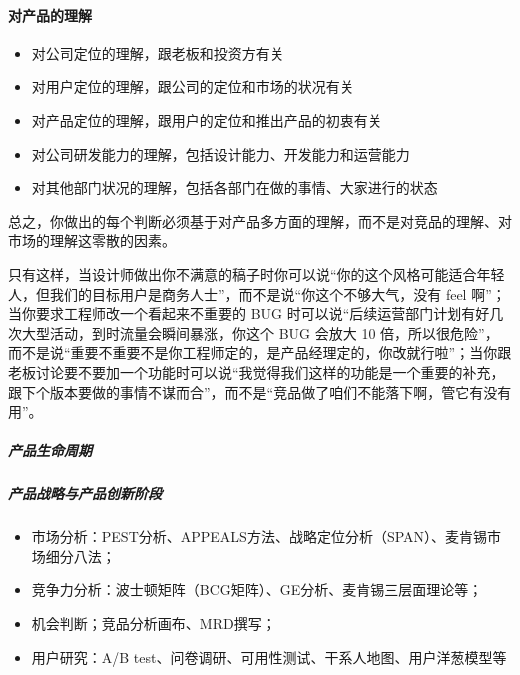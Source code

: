 \documentclass[letterpaper,10pt,english]{sphinxmanual}
\begin{document}
\paragraph{对产品的理解}
\label{\detokenize{chapter_introduction/ability:id9}}\begin{itemize}
\item {} 
对公司定位的理解，跟老板和投资方有关

\item {} 
对用户定位的理解，跟公司的定位和市场的状况有关

\item {} 
对产品定位的理解，跟用户的定位和推出产品的初衷有关

\item {} 
对公司研发能力的理解，包括设计能力、开发能力和运营能力

\item {} 
对其他部门状况的理解，包括各部门在做的事情、大家进行的状态

\end{itemize}

总之，你做出的每个判断必须基于对产品多方面的理解，而不是对竞品的理解、对市场的理解这零散的因素。

只有这样，当设计师做出你不满意的稿子时你可以说“你的这个风格可能适合年轻人，但我们的目标用户是商务人士”，而不是说“你这个不够大气，没有
feel 啊”；当你要求工程师改一个看起来不重要的 BUG
时可以说“后续运营部门计划有好几次大型活动，到时流量会瞬间暴涨，你这个
BUG 会放大 10
倍，所以很危险”，而不是说“重要不重要不是你工程师定的，是产品经理定的，你改就行啦”；当你跟老板讨论要不要加一个功能时可以说“我觉得我们这样的功能是一个重要的补充，跟下个版本要做的事情不谋而合”，而不是“竞品做了咱们不能落下啊，管它有没有用”。%
\begin{footnote}[344]\sphinxAtStartFootnote
{}
%
\end{footnote}


\subparagraph{产品生命周期}
\label{\detokenize{chapter_introduction/ability:id10}}

\subparagraph{产品战略与产品创新阶段}
\label{\detokenize{chapter_introduction/ability:id11}}\begin{itemize}
\item {} 
市场分析：PEST分析、APPEALS方法、战略定位分析（SPAN）、麦肯锡市场细分八法；

\item {} 
竞争力分析：波士顿矩阵（BCG矩阵）、GE分析、麦肯锡三层面理论等；

\item {} 
机会判断；竞品分析画布、MRD撰写；

\item {} 
用户研究：A/B test、问卷调研、可用性测试、干系人地图、用户洋葱模型等

\end{itemize}
\end{document}
